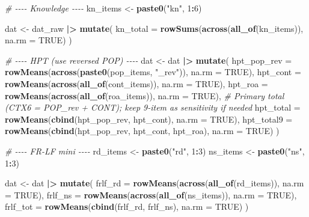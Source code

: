 \documentclass[
  10pt,
]{article}
\newenvironment{Shaded}{\begin{snugshade}}{\end{snugshade}}
\newcommand{\AttributeTok}[1]{\textcolor[rgb]{0.13,0.29,0.53}{#1}}
\newcommand{\CommentTok}[1]{\textcolor[rgb]{0.56,0.35,0.01}{\textit{#1}}}
\newcommand{\ConstantTok}[1]{\textcolor[rgb]{0.56,0.35,0.01}{#1}}
\newcommand{\DecValTok}[1]{\textcolor[rgb]{0.00,0.00,0.81}{#1}}
\newcommand{\FunctionTok}[1]{\textcolor[rgb]{0.13,0.29,0.53}{\textbf{#1}}}
\newcommand{\NormalTok}[1]{#1}
\newcommand{\OtherTok}[1]{\textcolor[rgb]{0.56,0.35,0.01}{#1}}
\newcommand{\SpecialCharTok}[1]{\textcolor[rgb]{0.81,0.36,0.00}{\textbf{#1}}}
\newcommand{\StringTok}[1]{\textcolor[rgb]{0.31,0.60,0.02}{#1}}
\begin{document}
\begin{Shaded}
\begin{Highlighting}[]
\CommentTok{\# {-}{-}{-}{-} Knowledge {-}{-}{-}{-}}
\NormalTok{kn\_items }\OtherTok{\textless{}{-}} \FunctionTok{paste0}\NormalTok{(}\StringTok{"kn"}\NormalTok{, }\DecValTok{1}\SpecialCharTok{:}\DecValTok{6}\NormalTok{)}

\NormalTok{dat }\OtherTok{\textless{}{-}}\NormalTok{ dat\_raw }\SpecialCharTok{|\textgreater{}}
  \FunctionTok{mutate}\NormalTok{(}
    \AttributeTok{kn\_total =} \FunctionTok{rowSums}\NormalTok{(}\FunctionTok{across}\NormalTok{(}\FunctionTok{all\_of}\NormalTok{(kn\_items)), }\AttributeTok{na.rm =} \ConstantTok{TRUE}\NormalTok{)}
\NormalTok{  )}

\CommentTok{\# {-}{-}{-}{-} HPT (use reversed POP) {-}{-}{-}{-}}
\NormalTok{dat }\OtherTok{\textless{}{-}}\NormalTok{ dat }\SpecialCharTok{|\textgreater{}}
  \FunctionTok{mutate}\NormalTok{(}
    \AttributeTok{hpt\_pop\_rev =} \FunctionTok{rowMeans}\NormalTok{(}\FunctionTok{across}\NormalTok{(}\FunctionTok{paste0}\NormalTok{(pop\_items, }\StringTok{"\_rev"}\NormalTok{)), }\AttributeTok{na.rm =} \ConstantTok{TRUE}\NormalTok{),}
    \AttributeTok{hpt\_cont    =} \FunctionTok{rowMeans}\NormalTok{(}\FunctionTok{across}\NormalTok{(}\FunctionTok{all\_of}\NormalTok{(cont\_items)),       }\AttributeTok{na.rm =} \ConstantTok{TRUE}\NormalTok{),}
    \AttributeTok{hpt\_roa     =} \FunctionTok{rowMeans}\NormalTok{(}\FunctionTok{across}\NormalTok{(}\FunctionTok{all\_of}\NormalTok{(roa\_items)),        }\AttributeTok{na.rm =} \ConstantTok{TRUE}\NormalTok{),}
    \CommentTok{\# Primary total (CTX6 = POP\_rev + CONT); keep 9{-}item as sensitivity if needed}
    \AttributeTok{hpt\_total   =} \FunctionTok{rowMeans}\NormalTok{(}\FunctionTok{cbind}\NormalTok{(hpt\_pop\_rev, hpt\_cont), }\AttributeTok{na.rm =} \ConstantTok{TRUE}\NormalTok{),}
    \AttributeTok{hpt\_total9  =} \FunctionTok{rowMeans}\NormalTok{(}\FunctionTok{cbind}\NormalTok{(hpt\_pop\_rev, hpt\_cont, hpt\_roa), }\AttributeTok{na.rm =} \ConstantTok{TRUE}\NormalTok{)}
\NormalTok{  )}

\CommentTok{\# {-}{-}{-}{-} FR{-}LF mini {-}{-}{-}{-}}
\NormalTok{rd\_items }\OtherTok{\textless{}{-}} \FunctionTok{paste0}\NormalTok{(}\StringTok{"rd"}\NormalTok{, }\DecValTok{1}\SpecialCharTok{:}\DecValTok{3}\NormalTok{)}
\NormalTok{ns\_items }\OtherTok{\textless{}{-}} \FunctionTok{paste0}\NormalTok{(}\StringTok{"ns"}\NormalTok{, }\DecValTok{1}\SpecialCharTok{:}\DecValTok{3}\NormalTok{)}

\NormalTok{dat }\OtherTok{\textless{}{-}}\NormalTok{ dat }\SpecialCharTok{|\textgreater{}}
  \FunctionTok{mutate}\NormalTok{(}
    \AttributeTok{frlf\_rd  =} \FunctionTok{rowMeans}\NormalTok{(}\FunctionTok{across}\NormalTok{(}\FunctionTok{all\_of}\NormalTok{(rd\_items)), }\AttributeTok{na.rm =} \ConstantTok{TRUE}\NormalTok{),}
    \AttributeTok{frlf\_ns  =} \FunctionTok{rowMeans}\NormalTok{(}\FunctionTok{across}\NormalTok{(}\FunctionTok{all\_of}\NormalTok{(ns\_items)), }\AttributeTok{na.rm =} \ConstantTok{TRUE}\NormalTok{),}
    \AttributeTok{frlf\_tot =} \FunctionTok{rowMeans}\NormalTok{(}\FunctionTok{cbind}\NormalTok{(frlf\_rd, frlf\_ns),  }\AttributeTok{na.rm =} \ConstantTok{TRUE}\NormalTok{)}
\NormalTok{  )}


\end{Highlighting}
\end{Shaded}
\end{document}
